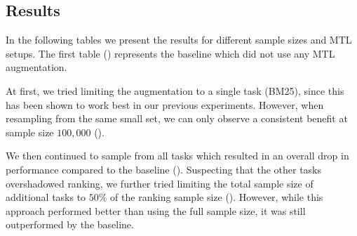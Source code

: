 \subsection{Results}
In the following tables we present the results for different sample sizes and MTL setups. The first table () represents the baseline which did not use any MTL augmentation.

At first, we tried limiting the augmentation to a single task (BM25), since this has been shown to work best in our previous experiments. However, when resampling from the same small set, we can only observe a consistent benefit at sample size $100,000$ ().

We then continued to sample from all tasks which resulted in an overall drop in performance compared to the baseline (). Suspecting that the other tasks overshadowed ranking, we further tried limiting the total sample size of additional tasks to $50\%$ of the ranking sample size (). However, while this approach performed better than using the full sample size, it was still outperformed by the baseline.

